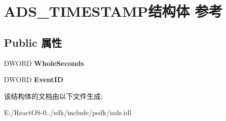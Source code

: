\hypertarget{struct_a_d_s___t_i_m_e_s_t_a_m_p}{}\section{A\+D\+S\+\_\+\+T\+I\+M\+E\+S\+T\+A\+M\+P结构体 参考}
\label{struct_a_d_s___t_i_m_e_s_t_a_m_p}
\subsection*{Public 属性}
\begin{DoxyCompactItemize}
\item 
\mbox{\label{struct_a_d_s___t_i_m_e_s_t_a_m_p_a67c14b2435a8f684871a13b9d8d454b3}} 
D\+W\+O\+RD {\bfseries Whole\+Seconds}
\item 
\mbox{\label{struct_a_d_s___t_i_m_e_s_t_a_m_p_a5b3992fae4027f86552db2083c1cbdb1}} 
D\+W\+O\+RD {\bfseries Event\+ID}
\end{DoxyCompactItemize}


该结构体的文档由以下文件生成\+:\begin{DoxyCompactItemize}
\item 
E\+:/\+React\+O\+S-\/0../sdk/include/psdk/iads.\+idl\end{DoxyCompactItemize}
